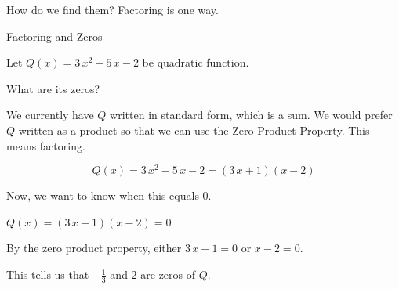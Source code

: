 \documentclass{ximera}
\begin{document}
\begin{image}
\end{image}



How do we find them? Factoring is one way.  

\begin{example} Factoring and Zeros


Let $Q(x) = 3 \, x^2 - 5 \, x - 2$ be quadratic function. 

What are its zeros? 

We currently have $Q$ written in standard form, which is a sum.  We would prefer $Q$ written as a product so that we can use the Zero Product Property.  This means factoring. 


\[
Q(x) = 3 \, x^2 - 5 \, x - 2 = (3 \, x + 1)(x - 2)
\]

Now, we want to know when this equals $0$. 


$Q(x) = (3 \, x + 1)(x - 2) =0$ 

By the zero product property, either $3 \, x + 1 = 0$ or $x - 2 = 0$. 

This tells us that $-\frac{1}{3}$ and $2$ are zeros of $Q$.




\end{example}
\end{document}
